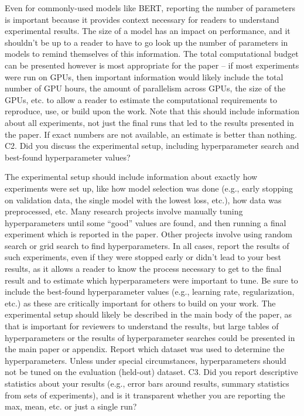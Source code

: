 Even for commonly-used models like BERT, reporting the number of parameters is important because it provides context necessary for readers to understand experimental results. The size of a model has an impact on performance, and it shouldn’t be up to a reader to have to go look up the number of parameters in models to remind themselves of this information.
The total computational budget can be presented however is most appropriate for the paper – if most experiments were run on GPUs, then important information would likely include the total number of GPU hours, the amount of parallelism across GPUs, the size of the GPUs, etc. to allow a reader to estimate the computational requirements to reproduce, use, or build upon the work.
Note that this should include information about all experiments, not just the final runs that led to the results presented in the paper. If exact numbers are not available, an estimate is better than nothing.
C2. Did you discuss the experimental setup, including hyperparameter search and best-found hyperparameter values?

The experimental setup should include information about exactly how experiments were set up, like how model selection was done (e.g., early stopping on validation data, the single model with the lowest loss, etc.), how data was preprocessed, etc.
Many research projects involve manually tuning hyperparameters until some “good” values are found, and then running a final experiment which is reported in the paper. Other projects involve using random search or grid search to find hyperparameters. In all cases, report the results of such experiments, even if they were stopped early or didn’t lead to your best results, as it allows a reader to know the process necessary to get to the final result and to estimate which hyperparameters were important to tune.
Be sure to include the best-found hyperparameter values (e.g., learning rate, regularization, etc.) as these are critically important for others to build on your work.
The experimental setup should likely be described in the main body of the paper, as that is important for reviewers to understand the results, but large tables of hyperparameters or the results of hyperparameter searches could be presented in the main paper or appendix.
Report which dataset was used to determine the hyperparameters. Unless under special circumstances, hyperparameters should not be tuned on the evaluation (held-out) dataset.
C3. Did you report descriptive statistics about your results (e.g., error bars around results, summary statistics from sets of experiments), and is it transparent whether you are reporting the max, mean, etc. or just a single run?

